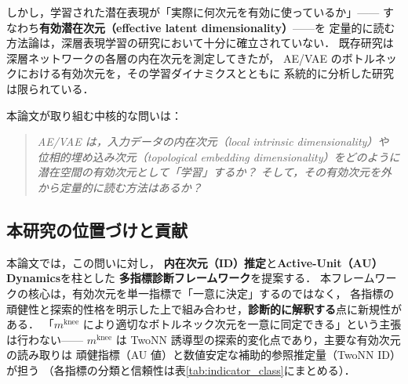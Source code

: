 \documentclass[11pt,a4paper]{jsarticle}
\newcommand{\mknee}{m^{\mathrm{knee}}}
\begin{document}
しかし，学習された潜在表現が「実際に何次元を有効に使っているか」——
すなわち\textbf{有効潜在次元（effective latent dimensionality）}——を
定量的に読む方法論は，深層表現学習の研究において十分に確立されていない．
既存研究\cite{ansuini2019intrinsic,valeriani2023geometry}は
深層ネットワークの各層の内在次元を測定してきたが，
AE/VAE のボトルネックにおける有効次元を，その学習ダイナミクスとともに
系統的に分析した研究は限られている．

本論文が取り組む中核的な問いは：
\begin{quote}
\textit{AE/VAE は，入力データの内在次元（local intrinsic dimensionality）や
位相的埋め込み次元（topological embedding dimensionality）をどのように
潜在空間の有効次元として「学習」するか？
そして，その有効次元を外から定量的に読む方法はあるか？}
\end{quote}

\subsection{本研究の位置づけと貢献}\label{sec:intro_aim}

本論文では，この問いに対し，
\textbf{内在次元（ID）推定}と\textbf{Active-Unit（AU）Dynamics}を柱とした
\textbf{多指標診断フレームワーク}を提案する．
本フレームワークの核心は，有効次元を単一指標で「一意に決定」するのではなく，
各指標の頑健性と探索的性格を明示した上で組み合わせ，\textbf{診断的に解釈する}点に新規性がある．
「$\mknee$ により適切なボトルネック次元を一意に同定できる」という主張は行わない——
$\mknee$ は TwoNN 誘導型の探索的変化点であり，主要な有効次元の読み取りは
頑健指標（AU 値）と数値安定な補助的参照推定量（TwoNN ID）が担う
（各指標の分類と信頼性は表\ref{tab:indicator_class}にまとめる）．
\end{document}
